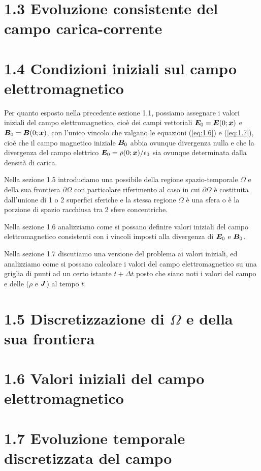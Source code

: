 \section*{1.3 Evoluzione consistente del campo carica-corrente}\label{sec_1.3}



\section*{1.4 Condizioni iniziali sul campo elettromagnetico}\label{sec_1.4}
Per quanto esposto nella precedente sezione 1.1, possiamo assegnare i valori iniziali del campo elettromagnetico, cioè dei campi vettoriali $\vb*{E}_0 = \vb*{E}(0; \vb*{x})$ e $\vb*{B}_0 = \vb*{B}(0; \vb*{x})$, con l'unico vincolo che valgano le equazioni (\ref{eq:1.6}) e (\ref{eq:1.7}), cioè che il campo magnetico iniziale $\vb*{B}_0$ abbia ovunque divergenza nulla e che la divergenza del campo elettrico $\vb*{E}_0 = \rho(0; \vb*{x})/\epsilon_0$ sia ovunque determinata dalla densità di carica. 

Nella sezione 1.5 introduciamo una possibile  della regione spazio-temporale $\Omega$ e della sua frontiera $\partial \Omega$ con particolare riferimento al caso in cui  $\partial \Omega$ è costituita dall'unione di 1 o 2 superfici sferiche e la stessa regione $\Omega$ è una sfera o è la porzione di spazio racchiusa tra 2 sfere concentriche. 

Nella sezione 1.6 analizziamo come si possano definire valori iniziali del campo elettromagnetico consistenti con i vincoli imposti alla divergenza di $\vb*{E}_0$ e $\vb*{B}_0$.

Nella sezione 1.7 discutiamo una versione  del problema ai valori iniziali, ed analizziamo come si possano calcolare i valori del campo elettromagnetico su una griglia di punti ad un certo istante $t+\Delta t$ posto che siano noti i valori del campo e delle  ($\rho$ e $\vb*{J}$) al tempo $t$. 
 

\section*{1.5 Discretizzazione di $\Omega$ e della sua frontiera}\label{sec_1.5}


\section*{1.6 Valori iniziali del campo elettromagnetico}\label{sec_1.6}


\section*{1.7 Evoluzione temporale discretizzata del campo}\label{sec_1.6}

